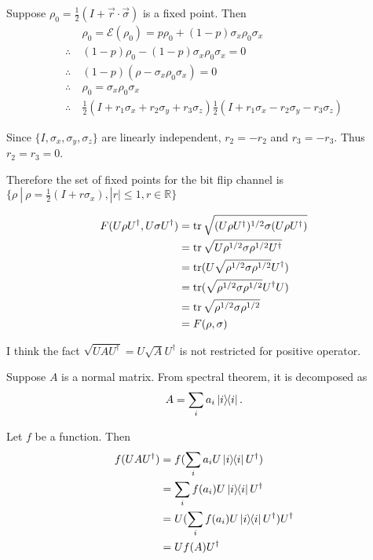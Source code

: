 Suppose $\rho_0 = \frac{1}{2}(I + \vec{r}\cdot \vec{\sigma})$ is a fixed point. Then
\begin{align*}
	&\rho_0 = \mathcal{E}(\rho_0) =p \rho_0 + (1-p) \sigma_x \rho_0 \sigma_x\\
	\therefore~ &(1-p) \rho_0 - (1-p) \sigma_x \rho_0 \sigma_x = 0\\
	\therefore~ &(1-p) (\rho - \sigma_x \rho_0 \sigma_x) = 0\\
	\therefore~ &\rho_0 = \sigma_x \rho_0 \sigma_x\\
	\therefore~ &\frac{1}{2} (I + r_1 \sigma_x + r_2 \sigma_y + r_3 \sigma_z)  \frac{1}{2} (I + r_1 \sigma_x - r_2 \sigma_y - r_3 \sigma_z)
\end{align*}

Since $\{I, \sigma_x, \sigma_y, \sigma_z \}$ are linearly independent, $r_2 = -r_2$ and $r_3 = - r_3$. Thus $r_2 = r_3 = 0$.

Therefore the set of fixed points for the bit flip channel is $\{\rho~ |~ \rho = \frac{1}{2}(I + r \sigma_x), |r| \leq 1, r \in \mathds{R} \}$



\begin{align*}
	F(U \rho U^\dagger, U \sigma U^\dagger) &= \operatorname{tr} \sqrt{(U\rho U^\dagger)^{1/2} \sigma (U \rho U^\dagger)}\\
		&= \operatorname{tr} \sqrt{U \rho^{1/2} \sigma \rho^{1/2} U^\dagger}\\
		&= \operatorname{tr} (U \sqrt{\rho^{1/2} \sigma \rho^{1/2}} U^\dagger)\\
		&= \operatorname{tr} (\sqrt{\rho^{1/2} \sigma \rho^{1/2}} U^\dagger U)\\
		&= \operatorname{tr} \sqrt{\rho^{1/2} \sigma \rho^{1/2}}\\
		&= F(\rho, \sigma)
\end{align*}

\begin{screen}
	I think the fact $\sqrt{UAU^\dagger} = U\sqrt{A}U^\dagger$ is not restricted for positive operator.

	Suppose $A$ is a normal matrix. From spectral theorem, it is decomposed as
	\begin{align*}
		A = \sum_i a_i \ket{i}\hspace{-1mm} \bra{i}.
	\end{align*}

	Let $f$ be a function. Then
	\begin{align*}
		f(UAU^\dagger )&= f(\sum_i a_i U \ket{i}\hspace{-1mm} \bra{i} U^\dagger)\\
			&= \sum_i f(a_i) U \ket{i}\hspace{-1mm} \bra{i} U^\dagger\\
			&= U (\sum_i f(a_i) U \ket{i}\hspace{-1mm} \bra{i} U^\dagger) U^\dagger\\
			&= U f(A) U^\dagger
	\end{align*}
\end{screen}


